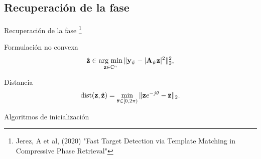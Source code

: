 \documentclass[aspectratio=169,t,xcolor=table]{beamer}
\DeclareMathOperator*{\argmin}{arg \ min}
\begin{document}
\subsection{Recuperación de la fase}
\begin{frame}{Recuperación de la fase \footnote{\tiny Jerez, A et al, (2020) "Fast Target Detection via Template Matching in Compressive Phase Retrieval"}}
\scriptsize
\vspace{-1cm}
\begin{block}{\scriptsize Formulación no convexa}
\centering
    \vspace{-1cm}
    \begin{equation}
    \small
    \hat{\mathbf{z}} \in \argmin_{{\mathbf{z}}\in\mathbb{C}^n}\Vert\mathbf{y}_{\psi} - \vert \mathbf{A}_{\psi}\mathbf{z} \vert^2\Vert_2^2, 
        \label{eq:phase_retrieval_problem}
    \end{equation}
\end{block}
\vspace{-1cm}
\begin{block}{\scriptsize Distancia}
\centering
    \vspace{-1cm}
    \begin{equation}
    \small
    \mathrm{dist}(\mathbf{z}, \hat{\mathbf{z}}) = \min_{\theta \in [0, 2\pi)}\Vert \mathbf{z}e^{-j\theta} - \tilde{\mathbf{z}}\Vert_2.
    \end{equation}
\end{block}

\vspace{0.5cm}

%
\hfill%
{%
\begin{minipage}[t]{0.55\linewidth}
    \begin{block}{\scriptsize Algoritmos de inicialización}
        \vspace{-0.2cm}
        \hspace{2cm}
        \begin{itemize}
    

\end{itemize}
\end{block}
\end{minipage}}
\end{frame}
\end{document}
